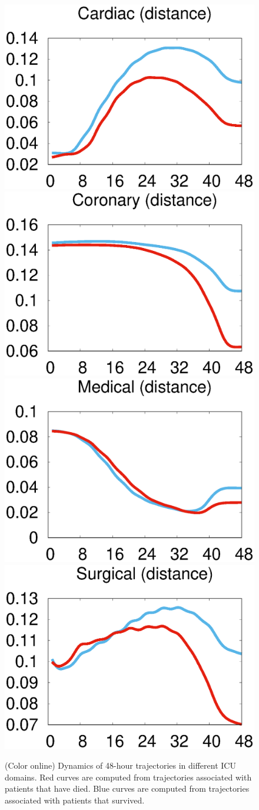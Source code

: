 \begin{figure}[h!]
\begin{center}
		
		\hspace{-0.375in}
		\includegraphics[width=0.295\linewidth]{figs/dynamics_dist_icu1}
		\hspace{-0.375in}
		\includegraphics[width=0.295\linewidth]{figs/dynamics_dist_icu2}
		\hspace{-0.375in}
		\includegraphics[width=0.295\linewidth]{figs/dynamics_dist_icu3}
		\hspace{-0.375in}
		\includegraphics[width=0.295\linewidth]{figs/dynamics_dist_icu4}
	\end{center}
	\vspace{-0.134in}
	\caption{(Color online) Dynamics of 48-hour trajectories in different ICU domains. Red curves are computed from trajectories associated with patients that have died. Blue curves are computed from trajectories associated with patients that survived.}
	\label{fig:dynamics}
\end{figure}

